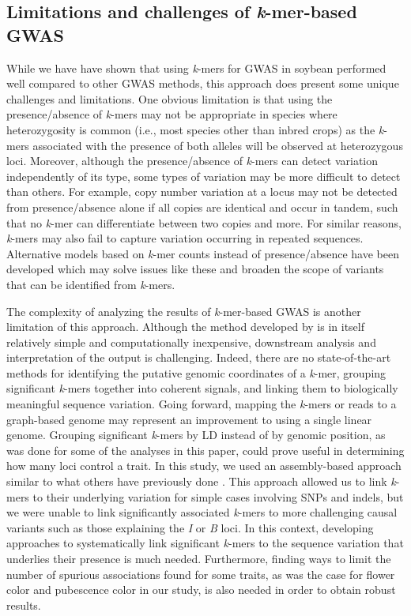 \subsection*{Limitations and challenges of \emph{k}-mer-based GWAS}
\label{limitations-of-kmers-GWAS}

While we have have shown that using \emph{k}-mers for GWAS in soybean performed
well compared to other GWAS methods, this approach does present some unique
challenges and limitations. One obvious limitation is that using the
presence/absence of \emph{k}-mers may not be appropriate in species where
heterozygosity is common (i.e., most species other than inbred crops) as the
\emph{k}-mers associated with the presence of both alleles will be observed at
heterozygous loci. Moreover, although the presence/absence of \emph{k}-mers can
detect variation independently of its type, some types of variation may be more
difficult to detect than others.  For example, copy number variation at a locus
may not be detected from presence/absence alone if all copies are identical and
occur in tandem, such that no \textit{k}-mer can differentiate between two
copies and more. For similar reasons, \emph{k}-mers may also fail to capture
variation occurring in repeated sequences. Alternative models based on
\emph{k}-mer counts instead of presence/absence have been developed
\citep{rahman2018, he2021} which may solve issues like these and broaden the
scope of variants that can be identified from \emph{k}-mers.

The complexity of analyzing the results of \emph{k}-mer-based GWAS is another
limitation of this approach. Although the method developed by
\cite{voichek2020} is in itself relatively simple and computationally
inexpensive, downstream analysis and interpretation of the output is
challenging. Indeed, there are no state-of-the-art methods for identifying the
putative genomic coordinates of a \emph{k}-mer, grouping significant
\emph{k}-mers together into coherent signals, and linking them to biologically
meaningful sequence variation. Going forward, mapping the \emph{k}-mers or
reads to a graph-based genome \citep[e.g. using the vg toolkit;][]{siren2021}
may represent an improvement to using a single linear genome.  Grouping
significant \emph{k}-mers by LD instead of by genomic position, as was done for
some of the analyses in this paper, could prove useful in determining how many
loci control a trait. In this study, we used an assembly-based approach similar
to what others have previously done \citep[e.g.][]{voichek2020, rahman2018}.
This approach allowed us to link \emph{k}-mers to their underlying variation
for simple cases involving SNPs and indels, but we were unable to link
significantly associated \emph{k}-mers to more challenging causal variants such
as those explaining the \emph{I} or \emph{B} loci. In this context, developing
approaches to systematically link significant \emph{k}-mers to the sequence
variation that underlies their presence is much needed. Furthermore, finding
ways to limit the number of spurious associations found for some traits, as was
the case for flower color and pubescence color in our study, is also needed in
order to obtain robust results.

